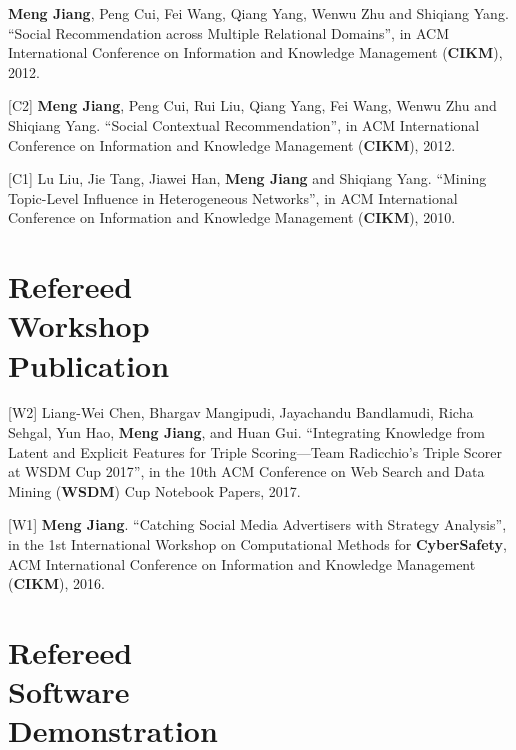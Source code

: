 \documentclass[margin, 9pt]{res}
\begin{document}
\begin{resume}
[C3] \textbf{Meng Jiang}, Peng Cui, Fei Wang, Qiang Yang, Wenwu Zhu and Shiqiang Yang. ``Social Recommendation across Multiple Relational Domains'', in ACM International Conference on Information and Knowledge Management (\textbf{CIKM}), 2012.

[C2] \textbf{Meng Jiang}, Peng Cui, Rui Liu, Qiang Yang, Fei Wang, Wenwu Zhu and Shiqiang Yang. ``Social Contextual Recommendation'', in ACM International Conference on Information and Knowledge Management (\textbf{CIKM}), 2012.

[C1] Lu Liu, Jie Tang, Jiawei Han, \textbf{Meng Jiang} and Shiqiang Yang. ``Mining Topic-Level Influence in Heterogeneous Networks'', in ACM International Conference on Information and Knowledge Management (\textbf{CIKM}), 2010.


\section{Refereed \\ Workshop \\ Publication}

[W2] Liang-Wei Chen, Bhargav Mangipudi, Jayachandu Bandlamudi, Richa Sehgal, Yun Hao, \textbf{Meng Jiang}, and Huan Gui. ``Integrating Knowledge from Latent and Explicit Features for Triple Scoring—Team Radicchio's Triple Scorer at WSDM Cup 2017'', in the 10th ACM Conference on Web Search and Data Mining (\textbf{WSDM}) Cup Notebook Papers, 2017.

[W1] \textbf{Meng Jiang}. ``Catching Social Media Advertisers with Strategy Analysis'', in the 1st International Workshop on Computational Methods for \textbf{CyberSafety}, ACM International Conference on Information and Knowledge Management (\textbf{CIKM}), 2016.


\section{Refereed \\ Software \\ Demonstration}


\end{resume}
\end{document}
